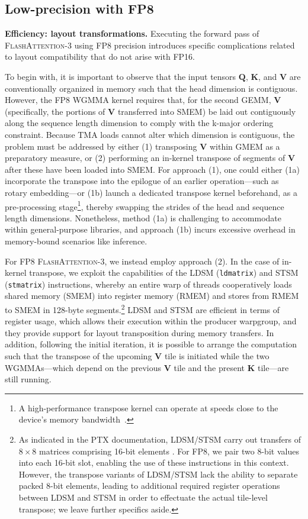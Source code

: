 \subsection{Low-precision with FP8}
\label{sec:algofp8}

\textbf{Efficiency: layout transformations.} Executing the forward pass of \textsc{FlashAttention-3} using FP8 precision introduces specific complications related to layout compatibility that do not arise with FP16.

To begin with, it is important to observe that the input tensors $\mathbf{Q}$, $\mathbf{K}$, and $\mathbf{V}$ are conventionally organized in memory such that the head dimension is contiguous. However, the FP8 WGMMA kernel requires that, for the second GEMM, $\mathbf{V}$ (specifically, the portions of $\mathbf{V}$ transferred into SMEM) be laid out contiguously along the sequence length dimension to comply with the k-major ordering constraint. Because TMA loads cannot alter which dimension is contiguous, the problem must be addressed by either (1) transposing $\mathbf{V}$ within GMEM as a preparatory measure, or (2) performing an in-kernel transpose of segments of $\mathbf{V}$ after these have been loaded into SMEM. For approach (1), one could either (1a) incorporate the transpose into the epilogue of an earlier operation—such as rotary embedding—or (1b) launch a dedicated transpose kernel beforehand, as a pre-processing stage\footnote{A high-performance transpose kernel can operate at speeds close to the device's memory bandwidth~\citep{colfax_cutlass_transpose_2024}.}, thereby swapping the strides of the head and sequence length dimensions. Nonetheless, method (1a) is challenging to accommodate within general-purpose libraries, and approach (1b) incurs excessive overhead in memory-bound scenarios like inference.

For FP8 \textsc{FlashAttention-3}, we instead employ approach (2). In the case of in-kernel transpose, we exploit the capabilities of the LDSM (\verb|ldmatrix|) and STSM (\verb|stmatrix|) instructions, whereby an entire warp of threads cooperatively loads shared memory (SMEM) into register memory (RMEM) and stores from RMEM to SMEM in 128-byte segments.\footnote{As indicated in the PTX documentation, LDSM/STSM carry out transfers of $8 \times 8$ matrices comprising 16-bit elements \cite[\S 9.7.13.4.15-16]{ptx}. For FP8, we pair two 8-bit values into each 16-bit slot, enabling the use of these instructions in this context. However, the transpose variants of LDSM/STSM lack the ability to separate packed 8-bit elements, leading to additional required register operations between LDSM and STSM in order to effectuate the actual tile-level transpose; we leave further specifics aside.} LDSM and STSM are efficient in terms of register usage, which allows their execution within the producer warpgroup, and they provide support for layout transposition during memory transfers. In addition, following the initial iteration, it is possible to arrange the computation such that the transpose of the upcoming $\mathbf{V}$ tile is initiated while the two WGMMAs—which depend on the previous $\mathbf{V}$ tile and the present $\mathbf{K}$ tile—are still running.


